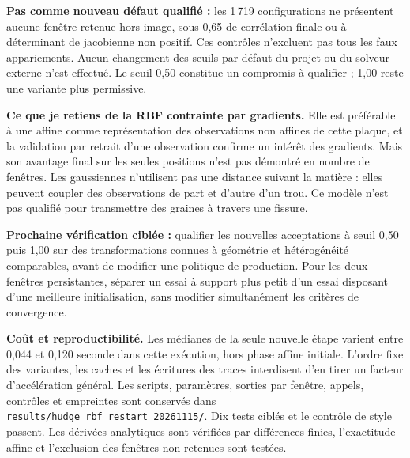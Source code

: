 \documentclass[11pt,a4paper,landscape]{article}
\begin{document}
\textbf{Pas comme nouveau défaut qualifié :} les 1\,719 configurations ne présentent
aucune fenêtre retenue hors image, sous 0,65 de corrélation finale ou à déterminant de
jacobienne non positif. Ces contrôles n'excluent pas tous les faux appariements. Aucun
changement des seuils par défaut du projet ou du solveur externe n'est effectué.
Le seuil 0,50 constitue un compromis à qualifier ; 1,00 reste une variante plus permissive.

\textbf{Ce que je retiens de la RBF contrainte par gradients.} Elle est préférable à
une affine comme représentation des observations non affines de cette plaque, et
la validation par retrait d'une observation confirme un intérêt des gradients. Mais
son avantage final sur les seules positions n'est pas démontré en nombre de fenêtres.
Les gaussiennes n'utilisent pas une distance suivant la matière : elles peuvent coupler
des observations de part et d'autre d'un trou. Ce modèle n'est pas qualifié pour transmettre
des graines à travers une fissure.

\textbf{Prochaine vérification ciblée :} qualifier les nouvelles acceptations à seuil
0,50 puis 1,00 sur des transformations connues à géométrie et hétérogénéité comparables,
avant de modifier une politique de production. Pour les deux fenêtres persistantes,
séparer un essai à support plus petit d'un essai disposant d'une meilleure initialisation,
sans modifier simultanément les critères de convergence.

\textbf{Coût et reproductibilité.} Les médianes de la seule nouvelle étape varient entre
0,044 et 0,120 seconde dans cette exécution, hors phase affine initiale. L'ordre fixe des
variantes, les caches et les écritures des traces interdisent d'en tirer un facteur
d'accélération général. Les scripts, paramètres, sorties par fenêtre, appels, contrôles
et empreintes sont conservés dans
\texttt{results/hudge\_rbf\_restart\_20261115/}. Dix tests ciblés et le contrôle de style
passent. Les dérivées analytiques sont vérifiées par différences finies, l'exactitude
affine et l'exclusion des fenêtres non retenues sont testées.
\end{document}
